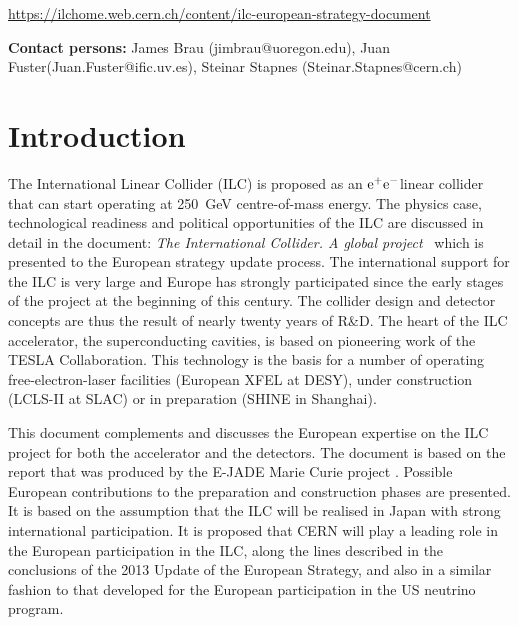 \documentclass[%
 reprint,
 floatfix,
 amsmath,amssymb,
 aps,
]{revtex4-1}
\newcommand{\epem}{\mbox{${\rm e}^+{\rm e}^-$}}
\begin{document}
\url{https://ilchome.web.cern.ch/content/ilc-european-strategy-document}

\textbf{Contact persons:} James Brau (jimbrau@uoregon.edu), Juan Fuster(Juan.Fuster@ific.uv.es), Steinar Stapnes (Steinar.Stapnes@cern.ch)

\pagebreak

\pagestyle{plain}
\setcounter{page}{1}

\twocolumngrid

\section{\label{sec:intro}Introduction}

The International Linear Collider (ILC) is proposed as an \epem linear collider that can start operating at  250~GeV centre-of-mass energy. The physics case, technological readiness and political opportunities of the ILC are discussed in detail in the document: \emph{The International Collider. A global project}~\cite{ILCforESS} which is presented to the European strategy update process. The international  support for the ILC is very large and Europe has strongly participated since the early stages of the project at the beginning of this century.   The collider design and detector concepts are thus the result of nearly twenty years of R\&D. The heart of the ILC accelerator, the superconducting cavities, is based on pioneering work of the TESLA Collaboration. This technology is the basis for a number of operating free-electron-laser facilities (European XFEL at DESY), under construction (LCLS-II at SLAC) or in preparation (SHINE in Shanghai).

This document complements \cite{ILCforESS} and discusses the European expertise on the ILC project for both the accelerator and the detectors. The document is based on the report \cite{ejade-report} that was produced by the E-JADE Marie Curie project \cite{ejade}. Possible European contributions to the preparation and construction phases are presented. It is based on the assumption that the ILC will be realised in Japan with strong international participation. 
It is proposed that CERN will play a leading role in the European participation in the ILC, along the lines described in the  conclusions of the 2013 Update of the European Strategy, and also in a similar fashion to that  developed for the European participation in the US neutrino program.  
\end{document}
